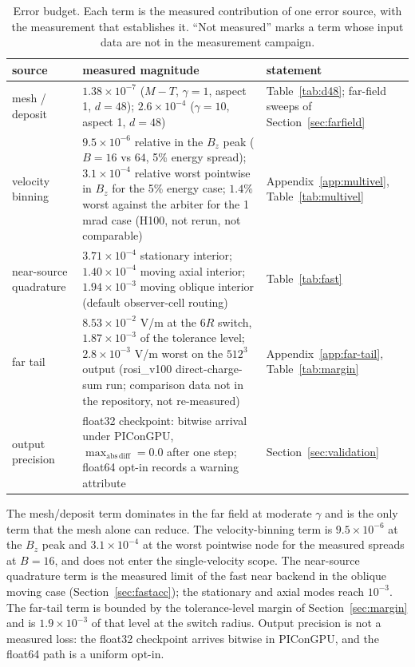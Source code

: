 \begin{table}[t]
\centering
\small
\caption{Error budget. Each term is the measured contribution of one error
source, with the measurement that establishes it. ``Not measured'' marks a
term whose input data are not in the measurement campaign.}
\label{tab:errbudget}
\begin{tabular}{p{2.6cm}p{3.6cm}p{4.6cm}}
\toprule
source & measured magnitude & statement \\
\midrule
mesh / deposit & $1.38\times10^{-7}$ ($M\!-\!T$, $\gamma=1$, aspect 1, $d=48$); $2.6\times10^{-4}$ ($\gamma=10$, aspect 1, $d=48$) & Table~\ref{tab:d48}; far-field sweeps of Section~\ref{sec:farfield} \\
velocity binning & $9.5\times10^{-6}$ relative in the $B_z$ peak ($B=16$ vs $64$, 5\% energy spread); $3.1\times10^{-4}$ relative worst pointwise in $B_z$ for the 5\% energy case; $1.4\%$ worst against the arbiter for the 1\,mrad case (H100, not rerun, not comparable) & Appendix~\ref{app:multivel}, Table~\ref{tab:multivel} \\
near-source quadrature & $3.71\times10^{-4}$ stationary interior; $1.40\times10^{-4}$ moving axial interior; $1.94\times10^{-3}$ moving oblique interior (default observer-cell routing) & Table~\ref{tab:fast} \\
far tail & $8.53\times10^{-2}$ V/m at the $6R$ switch, $1.87\times10^{-3}$ of the tolerance level; $2.8\times10^{-3}$ V/m worst on the $512^3$ output (rosi\_v100 direct-charge-sum run; comparison data not in the repository, not re-measured) & Appendix~\ref{app:far-tail}, Table~\ref{tab:margin} \\
output precision & float32 checkpoint: bitwise arrival under PIConGPU, $\max_\mathrm{abs\,diff}=0.0$ after one step; float64 opt-in records a warning attribute & Section~\ref{sec:validation} \\
\bottomrule
\end{tabular}
\end{table}

The mesh/deposit term dominates in the far field at moderate $\gamma$ and is
the only term that the mesh alone can reduce. The velocity-binning term is
$9.5\times10^{-6}$ at the $B_z$ peak and $3.1\times10^{-4}$ at the worst
pointwise node for the measured spreads at $B=16$, and does not enter the
single-velocity scope. The near-source quadrature term is the measured
limit of the fast near backend in the oblique moving case
(Section~\ref{sec:fastacc}); the stationary and axial modes reach
$10^{-3}$. The far-tail term is bounded by the tolerance-level margin of
Section~\ref{sec:margin} and is $1.9\times10^{-3}$ of that level at the
switch radius. Output precision is not a measured loss: the
float32 checkpoint arrives bitwise in PIConGPU, and the float64 path is a
uniform opt-in.

